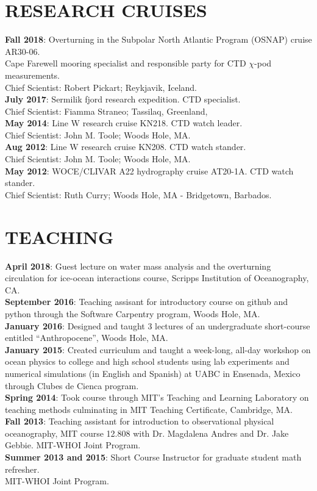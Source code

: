 \documentclass[paper=letter,fontsize=11pt]{scrartcl} %
\newcommand{\NewPart}[2]{\section*{\uppercase{#1} #2}}
\newcommand{\ShortEntry}[2]{\normalsize \noindent \textbf{#1}: #2 \\ }
\begin{document}
\NewPart{Research Cruises}{}
\ShortEntry{Fall 2018}{Overturning in the Subpolar North Atlantic Program (OSNAP) cruise AR30-06.\\ Cape Farewell mooring specialist and responsible party for CTD $\chi$-pod measurements.\\ Chief Scientist: Robert Pickart; Reykjavik, Iceland.}

\ShortEntry{July 2017}{Sermilik fjord research expedition. CTD specialist.\\ Chief Scientist: Fiamma Straneo; Tassilaq, Greenland,}

\ShortEntry{May 2014}{Line W research cruise KN218. CTD watch leader.\\ Chief Scientist: John M. Toole; Woods Hole, MA.}

\ShortEntry{Aug 2012}{Line W research cruise KN208. CTD watch stander.\\ Chief Scientist: John M. Toole; Woods Hole, MA.}

\ShortEntry{May 2012}{WOCE/CLIVAR A22 hydrography cruise AT20-1A. CTD watch stander.\\ Chief Scientist: Ruth Curry; Woods Hole, MA - Bridgetown, Barbados.}


\NewPart{Teaching}{}

\ShortEntry{April 2018}{Guest lecture on water mass analysis and the overturning circulation for ice-ocean interactions course, Scripps Institution of Oceanography, CA.}

\ShortEntry{September 2016}{Teaching assisant for introductory course on github and python through the Software Carpentry program, Woods Hole, MA.}

\ShortEntry{January 2016}{Designed and taught 3 lectures of an undergraduate short-course entitled ``Anthropocene'', Woods Hole, MA.}

\ShortEntry{January 2015}{Created curriculum and taught a week-long, all-day workshop on ocean physics to college and high school students using lab experiments and numerical simulations (in English and Spanish) at UABC in Ensenada, Mexico through Clubes de Cienca program.}

\ShortEntry{Spring 2014}{Took course through MIT's Teaching and Learning Laboratory on teaching methods culminating in MIT Teaching Certificate, Cambridge, MA.}

\ShortEntry{Fall 2013}{Teaching assistant for introduction to observational physical oceanography, MIT course 12.808 with Dr. Magdalena Andres and Dr. Jake Gebbie. MIT-WHOI Joint Program.}

\ShortEntry{Summer 2013 and 2015}{Short Course Instructor for graduate student math refresher.\\ MIT-WHOI Joint Program.}
\end{document}
